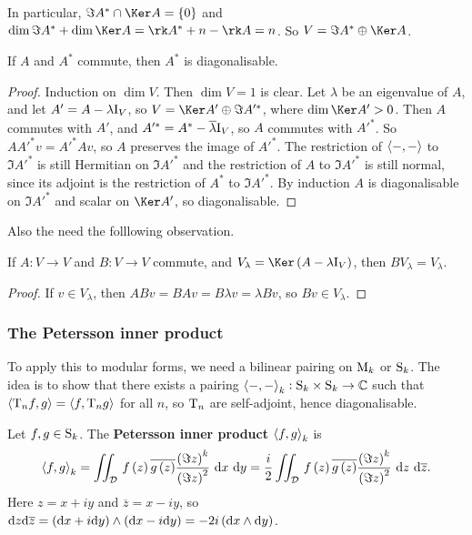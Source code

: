 In particular, $ \Im A^* \cap \Ker A = \cbr{0} $ and $ \dim \Im A^* + \dim \Ker A = \rk A^* + n - \rk A = n $. So $ V = \Im A^* \oplus \Ker A $.

\begin{theorem}
If $ A $ and $ A^* $ commute, then $ A^* $ is diagonalisable.
\end{theorem}

\begin{proof}
Induction on $ \dim V $. Then $ \dim V = 1 $ is clear. Let $ \lambda $ be an eigenvalue of $ A $, and let $ A' = A - \lambda\I_V $, so $ V = \Ker A' \oplus \Im A'^* $, where $ \dim \Ker A' > 0 $. Then $ A $ commutes with $ A' $, and $ A'^* = A^* - \overline{\lambda} \I_V $, so $ A $ commutes with $ A'^* $. So $ AA'^*v = A'^*Av $, so $ A $ preserves the image of $ A'^* $. The restriction of $ \abr{-, -} $ to $ \Im A'^* $ is still Hermitian on $ \Im A'^* $ and the restriction of $ A $ to $ \Im A'^* $ is still normal, since its adjoint is the restriction of $ A^* $ to $ \Im A'^* $. By induction $ A $ is diagonalisable on $ \Im A'^* $ and scalar on $ \Ker A' $, so diagonalisable.
\end{proof}

Also the need the folllowing observation.

\begin{proposition}
If $ A : V \to V $ and $ B : V \to V $ commute, and $ V_\lambda = \Ker \br{A - \lambda\I_V} $, then $ BV_\lambda = V_\lambda $.
\end{proposition}

\begin{proof}
If $ v \in V_\lambda $, then $ ABv = BAv = B\lambda v = \lambda Bv $, so $ Bv \in V_\lambda $.
\end{proof}

\subsubsection{The Petersson inner product}

To apply this to modular forms, we need a bilinear pairing on $ \M_k $ or $ \S_k $. The idea is to show that there exists a pairing $ \abr{-, -}_k : \S_k \times \S_k \to \CC $ such that $ \abr{\T_nf, g} = \abr{f, \T_ng} $ for all $ n $, so $ \T_n $ are self-adjoint, hence diagonalisable.

\begin{definition}
Let $ f, g \in \S_k $. The \textbf{Petersson inner product} $ \abr{f, g}_k $ is
$$ \abr{f, g}_k = \iintd{\DDD}{f\br{z}\overline{g\br{z}}\dfrac{\br{\Im z}^k}{\br{\Im z}^2}}{x}{y} = \dfrac{i}{2}\iintd{\DDD}{f\br{z}\overline{g\br{z}}\dfrac{\br{\Im z}^k}{\br{\Im z}^2}}{z}{\overline{z}}. $$
Here $ z = x + iy $ and $ \overline{z} = x - iy $, so $ \d z\d\overline{z} = \br{\d x + i\d y} \wedge \br{\d x - i\d y} = -2i\br{\d x \wedge \d y} $.
\end{definition}

